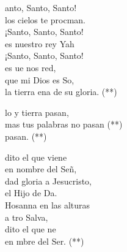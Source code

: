 \begin{cancion}[Santo][Carismático]%
	anto, Santo, Santo! \\
	los cielos te procman.\\
	\jump
¡Santo, Santo, Santo! \\
	es nuestro rey Yah\\
	¡Santo, Santo, Santo! \\
	es ue nos red,\\
	que mi Dios es So, \\
	la tierra ena de su gloria. (**)\jump\\
	\begin{chorus}%
		lo y tierra pasan, \\
		mas tus palabras no pasan (**)\\
		   pasan. (**)\jump\\
	\end{chorus}%
	dito el que viene \\
	en nombre del Señ, \\
	\jump
dad gloria a Jesucristo, \\
	el Hijo de Da.\\
	\jump
Hosanna en las alturas \\
	a tro Salva,\\
	dito el que ne \\
	en mbre del Ser. (**)\\
\end{cancion}%
